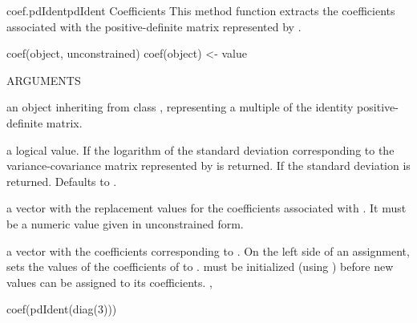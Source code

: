 \documentclass[pdftex]{article} \usepackage{url,graphicx}
\begin{document}
\begin{Helpfile}{coef.pdIdent}{pdIdent Coefficients}
This method function extracts the coefficients associated with the
positive-definite matrix represented by .
\begin{Example}
coef(object, unconstrained)
coef(object) <- value
\end{Example}
\begin{Argument}{ARGUMENTS}
\item[\Co{object:}]
an object inheriting from class ,
representing a multiple of the identity positive-definite matrix.
\item[\Co{unconstrained:}]
a logical value. If  the logarithm of
the standard deviation corresponding to the variance-covariance
matrix represented by  is returned. If  the
standard deviation is returned. Defaults to .
\item[\Co{value:}]
a vector with the replacement values for the coefficients
associated with . It must be a numeric value
given in unconstrained form.
\end{Argument}
a vector with the coefficients corresponding to .
On the left side of an assignment, sets the values of the coefficients
of  to .  must be initialized (using
) before new values can be assigned to its
coefficients.
, 
\need 15pt
\vspace{-16pt} 
\begin{Example}
coef(pdIdent(diag(3)))
\end{Example}
\end{Helpfile}
\end{document}
